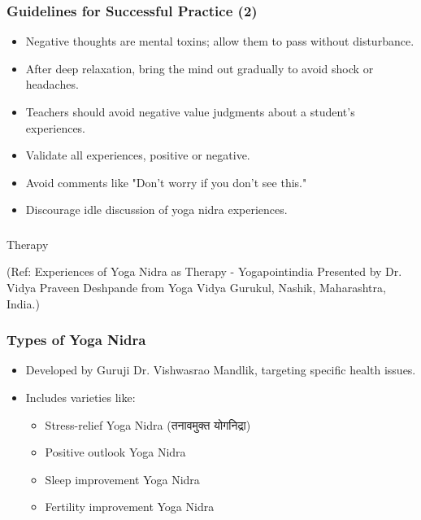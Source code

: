 \begin{frame}[fragile]\frametitle{Guidelines for Successful Practice (2)}
      \begin{itemize}
        \item Negative thoughts are mental toxins; allow them to pass without disturbance.
        \item After deep relaxation, bring the mind out gradually to avoid shock or headaches.
        \item Teachers should avoid negative value judgments about a student’s experiences.
        \item Validate all experiences, positive or negative.
        \item Avoid comments like "Don’t worry if you don’t see this."
        \item Discourage idle discussion of yoga nidra experiences.
      \end{itemize}
\end{frame}

\begin{frame}[fragile]\frametitle{}
\begin{center}
{\Large Therapy}

(Ref: Experiences of Yoga Nidra as Therapy - Yogapointindia Presented by Dr. Vidya Praveen Deshpande from Yoga Vidya Gurukul, Nashik, Maharashtra, India.)
\end{center}
\end{frame}

\begin{frame}[fragile]\frametitle{Types of Yoga Nidra}
    \begin{itemize}
        \item Developed by Guruji Dr. Vishwasrao Mandlik, targeting specific health issues.
        \item Includes varieties like:
        \begin{itemize}
            \item Stress-relief Yoga Nidra (तनावमुक्त योगनिद्रा)
            \item Positive outlook Yoga Nidra
            \item Sleep improvement Yoga Nidra
            \item Fertility improvement Yoga Nidra
        \end{itemize}
    \end{itemize}
\end{frame}

